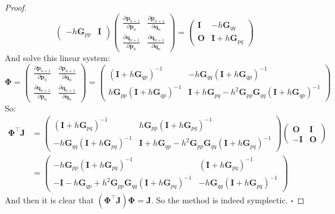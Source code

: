 \documentclass[a4paper, 10pt]{article}
\theoremstyle{definition}
\theoremstyle{hSol}
\begin{document}
\begin{proof}
\begin{equation}
\begin{pmatrix}
    -h\bm{G}_{pp} & \bm{I}
  \end{pmatrix}
  \begin{pmatrix}
    \frac{\partial \bm{p}_{n+1}}{\partial \bm{p}_n} & \frac{\partial \bm{p}_{n+1}}{\partial \bm{q}_n} \\[6pt]
    \frac{\partial \bm{q}_{n+1}}{\partial \bm{p}_n} & \frac{\partial \bm{q}_{n+1}}{\partial \bm{q}_n}
  \end{pmatrix} = 
  \begin{pmatrix}
    \bm{I} & -h \bm{G}_{qq} \\[6pt]
    \bm{O} & \bm{I} + h \bm{G}_{pq}
  \end{pmatrix}
  \end{equation}
  And solve this linear system:
  \begin{equation}
  \bm{\Phi} =
  \begin{pmatrix}
    \frac{\partial \bm{p}_{n+1}}{\partial \bm{p}_n} & \frac{\partial \bm{p}_{n+1}}{\partial \bm{q}_n} \\[6pt]
    \frac{\partial \bm{q}_{n+1}}{\partial \bm{p}_n} & \frac{\partial \bm{q}_{n+1}}{\partial \bm{q}_n}
  \end{pmatrix} = \begin{pmatrix}
    (\bm{I} + h \bm{G}_{qp})^{-1} & -h \bm{G}_{qq}(\bm{I} + h \bm{G}_{qp})^{-1} \\[6pt]
    h \bm{G}_{pp}(\bm{I} + h \bm{G}_{qp})^{-1} & \bm{I}+h\bm{G}_{pq} - h^2 \bm{G}_{pp} \bm{G}_{qq}(\bm{I} + h \bm{G}_{qp})^{-1}
  \end{pmatrix}
  \end{equation}
  So:
  \begin{equation}
    \begin{split}
      \bm{\Phi}^{\top} \bm{J} &= 
    \begin{pmatrix}
      (\bm{I} + h \bm{G}_{pq})^{-1} & h \bm{G}_{pp}(\bm{I} + h \bm{G}_{pq})^{-1} \\[6pt]
      -h \bm{G}_{qq}(\bm{I} + h \bm{G}_{pq})^{-1} & \bm{I} + h \bm{G}_{qp} - h^2 \bm{G}_{pp} \bm{G}_{qq}(\bm{I} + h \bm{G}_{pq})^{-1}
    \end{pmatrix}
    \begin{pmatrix}
      \bm{O} & \bm{I} \\
      -\bm{I} & \bm{O}
    \end{pmatrix} 
    \\ &=
    \begin{pmatrix}
      -h \bm{G}_{pp}(\bm{I} + h \bm{G}_{pq})^{-1} & (\bm{I} + h \bm{G}_{pq})^{-1} \\[6pt]
      -\bm{I} - h \bm{G}_{qp} + h^2 \bm{G}_{pp} \bm{G}_{qq}(\bm{I} + h \bm{G}_{pq})^{-1} & -h \bm{G}_{qq}(\bm{I} + h \bm{G}_{pq})^{-1} 
    \end{pmatrix}
    \end{split}
  \end{equation}
  And then it is clear that $(\bm{\Phi}^{\top} \bm{J}) \bm{\Phi} = \bm{J}$. So the method is indeed symplectic. $\square$


\end{proof}
\end{document}
